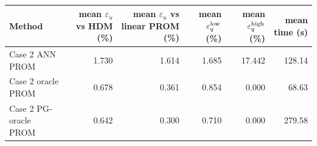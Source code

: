 \begin{tabular}{lrrrrr}
\toprule
Method & mean $\varepsilon_u$ vs HDM (\%) & mean $\varepsilon_u$ vs linear PROM (\%) & mean $\varepsilon_q^{\rm low}$ (\%) & mean $\varepsilon_q^{\rm high}$ (\%) & mean time (s) \\
\midrule
Case 2 ANN PROM & 1.730 & 1.614 & 1.685 & 17.442 & 128.14 \\
Case 2 oracle PROM & 0.678 & 0.361 & 0.854 & 0.000 & 68.63 \\
Case 2 PG-oracle PROM & 0.642 & 0.300 & 0.710 & 0.000 & 279.58 \\
\bottomrule
\end{tabular}
